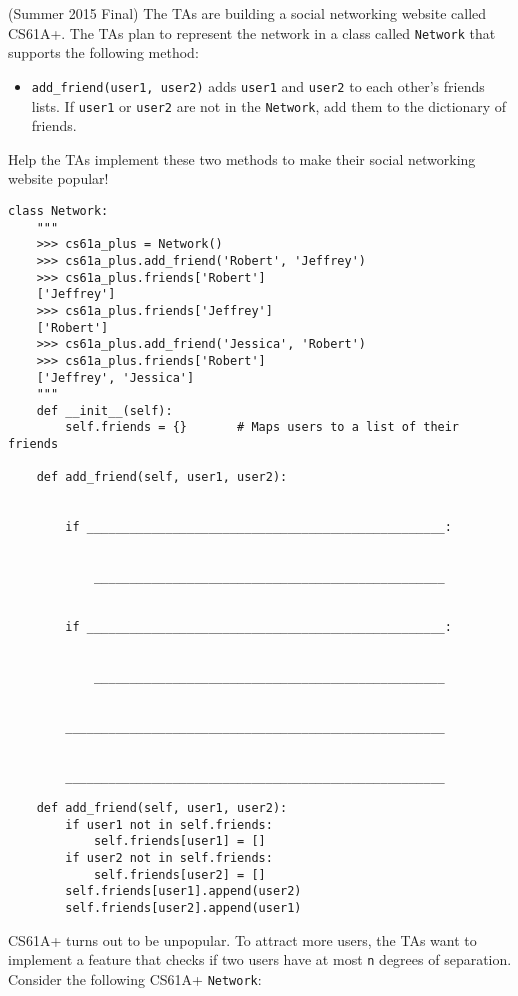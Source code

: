 \question (Summer 2015 Final) The TAs are building a social networking
website called CS61A+. The TAs plan to represent the network in a class
called \texttt{Network} that supports the following method:
\begin{itemize}
    \item \texttt{add\_friend(user1, user2)} adds \texttt{user1} and
        \texttt{user2} to each other's friends lists. If \texttt{user1} or
        \texttt{user2} are not in the \texttt{Network}, add them to the
        dictionary of friends.
\end{itemize}
Help the TAs implement these two methods to make their social networking website
popular!

\begin{lstlisting}
class Network:
    """
    >>> cs61a_plus = Network()
    >>> cs61a_plus.add_friend('Robert', 'Jeffrey')
    >>> cs61a_plus.friends['Robert']
    ['Jeffrey']
    >>> cs61a_plus.friends['Jeffrey']
    ['Robert']
    >>> cs61a_plus.add_friend('Jessica', 'Robert')
    >>> cs61a_plus.friends['Robert']
    ['Jeffrey', 'Jessica']
    """
    def __init__(self):
        self.friends = {}       # Maps users to a list of their friends

    def add_friend(self, user1, user2):


        if __________________________________________________:


            _________________________________________________


        if __________________________________________________:


            _________________________________________________


        _____________________________________________________


        _____________________________________________________
\end{lstlisting}
\begin{solution}
\begin{lstlisting}
    def add_friend(self, user1, user2):
        if user1 not in self.friends:
            self.friends[user1] = []
        if user2 not in self.friends:
            self.friends[user2] = []
        self.friends[user1].append(user2)
        self.friends[user2].append(user1)
\end{lstlisting}
\end{solution}

\clearpage

CS61A+ turns out to be unpopular. To attract more users, the TAs want to
implement a feature that checks if two users have at most \texttt{n} degrees of
separation. Consider the following CS61A+ \texttt{Network}:

